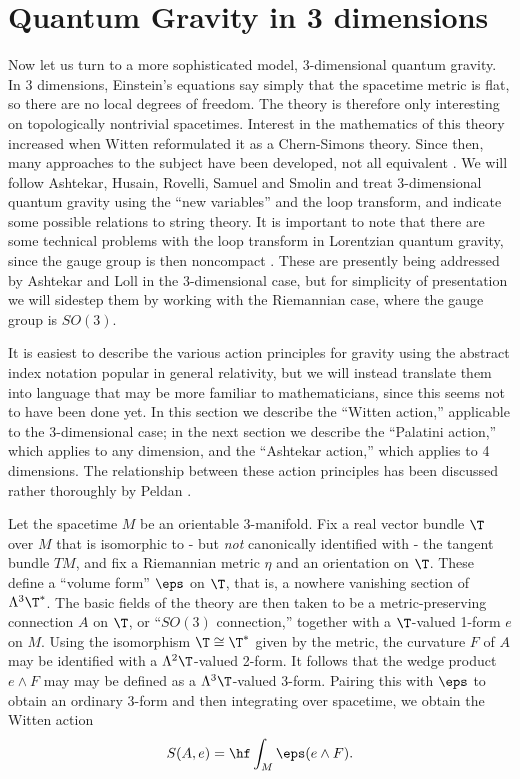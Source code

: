 \section{Quantum Gravity in 3 dimensions}

Now let us turn to a more sophisticated model, 3-dimensional  quantum
gravity.   In 3 dimensions, Einstein's equations say simply that the
spacetime metric is flat, so there are no local degrees of freedom. The
theory is therefore only interesting on topologically nontrivial
spacetimes.  Interest in the mathematics of this theory increased when
Witten \cite{Witten2} reformulated it as a Chern-Simons theory.  Since
then, many approaches to the subject have been developed, not all
equivalent \cite{Carlip}.   We will follow Ashtekar, Husain, Rovelli,
Samuel and Smolin \cite{A,AHRSS} and treat 3-dimensional quantum gravity
using the ``new variables'' and the loop transform, and indicate some
possible relations to string theory.  It is important to note that  there
are some technical problems with the loop transform in  Lorentzian quantum
gravity, since the gauge group is then noncompact \cite{Marolf}.  These are
presently being addressed by Ashtekar and Loll \cite{ALoll} in the
3-dimensional case,  but for simplicity of presentation we will sidestep
them by working with the Riemannian case, where the gauge group is $SO(3)$.

It is easiest to describe the various action principles for gravity using
the abstract index notation popular in general relativity, but we will
instead translate them into language that may be more familiar to
mathematicians, since this seems not to have been done yet.
In this section we describe the ``Witten action,''
applicable to the 3-dimensional case; in the next section we describe the
``Palatini action,'' which applies to any dimension, and the ``Ashtekar
action,'' which applies to 4 dimensions.  The relationship between these
action principles has been discussed rather thoroughly by Peldan
\cite{Peldan}.

Let the spacetime $M$ be an orientable 3-manifold.  Fix a real vector
bundle $\T$ over $M$ that is isomorphic to - but {\it not} canonically
identified with - the tangent bundle $TM$, and fix a Riemannian metric
$\eta$ and an orientation on $\T$.  These define a ``volume form'' $\eps$ on
$\T$, that is, a nowhere vanishing section of $\Lambda^3 \T^\ast$.
The basic fields of the theory are then taken to be a metric-preserving
connection $A$ on $\T$, or ``$SO(3)$ connection,'' together with a
$\T$-valued 1-form $e$ on $M$.   Using the isomorphism
$\T \cong \T^\ast$ given by the metric, the curvature $F$ of $A$ may be
identified with a $\Lambda^2 \T$-valued 2-form.  It follows that the wedge
product $e \wedge F$ may may be defined as a $\Lambda^3 \T$-valued 3-form.
Pairing this with $\eps$ to obtain an ordinary 3-form and then integrating
over spacetime, we obtain the Witten action
\[       S(A,e) = \hf \int_M \eps(e \wedge F)  .\]

